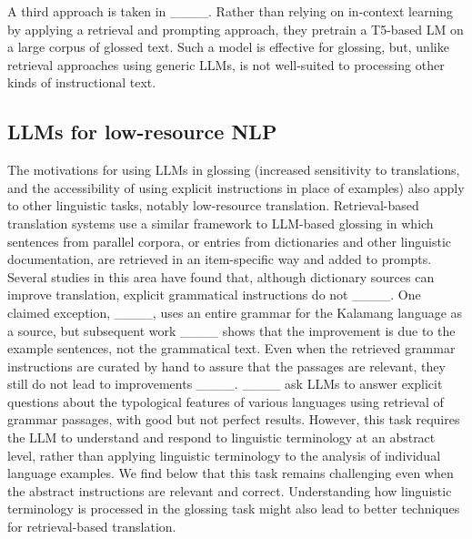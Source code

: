 A third approach is taken in ____. Rather than relying on in-context learning by applying a retrieval and prompting approach, they pretrain a T5-based LM on a large corpus of glossed text. Such a model is effective for glossing, but, unlike retrieval approaches using generic LLMs, is not well-suited to processing other kinds of instructional text.

\subsection{LLMs for low-resource NLP}

The motivations for using LLMs in glossing (increased sensitivity to translations, and the accessibility of using explicit instructions in place of examples) also apply to other linguistic tasks, notably low-resource translation. Retrieval-based translation systems use a similar framework to LLM-based glossing in which sentences from parallel corpora, or entries from dictionaries and other linguistic documentation, are retrieved in an item-specific way and added to prompts. Several studies in this area have found that, although dictionary sources can improve translation, explicit grammatical instructions do not ____. One claimed exception, ____, uses an entire grammar for the Kalamang language as a source, but subsequent work ____ shows that the improvement is due to the example sentences, not the grammatical text. Even when the retrieved grammar instructions are curated by hand to assure that the passages are relevant, they still do not lead to improvements ____. ____ ask LLMs to answer explicit questions about the typological features of various languages using retrieval of grammar passages, with good but not perfect results. However, this task requires the LLM to understand and respond to linguistic terminology at an abstract level, rather than applying linguistic terminology to the analysis of individual language examples. We find below that this task remains challenging even when the abstract instructions are relevant and correct. Understanding how linguistic terminology is processed in the glossing task might also lead to better techniques for retrieval-based translation.

